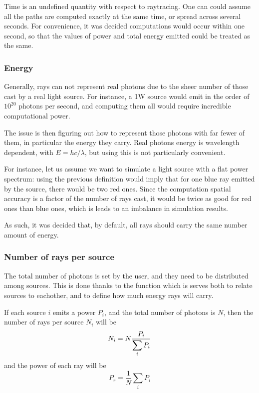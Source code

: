 Time is an undefined quantity with respect to raytracing. One can could assume all the paths are computed exactly at the same time, or spread across several seconds. For convenience, it was decided computations would occur within one second, so that the values of power and total energy emitted could be treated as the same.

\subsubsection{Energy}

Generally, rays can not represent real photons due to the sheer number of those cast by a real light source. For instance, a 1W source would emit in the order of $10^{20}$ photons per second, and computing them all would require incredible computational power.

The issue is then figuring out how to represent those photons with far fewer of them, in particular the energy they carry. Real photons energy is wavelength dependent, with $E=hc/\lambda$, but using this is not particularly convenient.

For instance, let us assume we want to simulate a light source with a flat power spectrum: using the previous definition would imply that for one blue ray emitted by the source, there would be two red ones. Since the computation spatial accuracy is a factor of the number of rays cast, it would be twice as good for red ones than blue ones, which is leads to an imbalance in simulation results.

As such, it was decided that, by default, all rays should carry the same number amount of energy.

\subsubsection{Number of rays per source}

The total number of photons is set by the user, and they need to be distributed among sources. This is done thanks to the  function which is serves both to relate sources to eachother, and to define how much energy rays will carry.

If each source $i$ emits a power $P_i$, and the total number of photons is $N$, then the number of rays per source $N_i$ will be
\begin{equation}
	N_i=N\frac{P_i}{\displaystyle \sum_i P_i}
\end{equation}
and the power of each ray will be
\begin{equation}
	P_r=\frac{1}{N} \sum_i P_i
\end{equation}